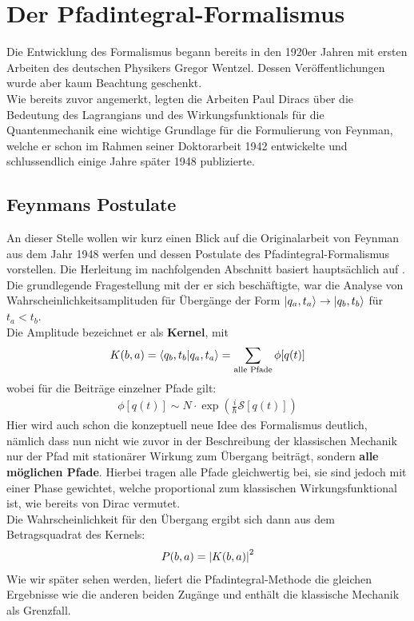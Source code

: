 \section{Der Pfadintegral-Formalismus}
Die Entwicklung des Formalismus begann bereits in den 1920er Jahren mit ersten Arbeiten des deutschen Physikers Gregor Wentzel. Dessen Veröffentlichungen wurde aber kaum Beachtung geschenkt. \\
Wie bereits zuvor angemerkt, legten die Arbeiten Paul Diracs über die Bedeutung des Lagrangians und des Wirkungsfunktionals für die Quantenmechanik eine wichtige Grundlage für die Formulierung von Feynman, welche er schon im Rahmen seiner Doktorarbeit 1942 entwickelte und schlussendlich einige Jahre später 1948 publizierte. 

\subsection{Feynmans Postulate}
An dieser Stelle wollen wir kurz einen Blick auf die Originalarbeit \cite{Feynman1948} von Feynman aus dem Jahr 1948 werfen und dessen Postulate des Pfadintegral-Formalismus vorstellen. Die Herleitung im nachfolgenden Abschnitt basiert hauptsächlich auf \cite{WeigandQFT2014}. \\
Die grundlegende Fragestellung mit der er sich beschäftigte, war die Analyse von Wahrscheinlichkeitsamplituden für Übergänge der Form $\ket{q_a,t_a}\rightarrow\ket{q_b,t_b}$ für $t_a<t_b$. \\
Die Amplitude bezeichnet er als \textbf{Kernel}, mit
\begin{align}
		K(b,a) = \braket{q_b,t_b}{q_a,t_a} 
			   = \sum_{\text{alle Pfade}}\phi[q(t)]
\end{align}
wobei für die Beiträge einzelner Pfade gilt:
\begin{align}
		\phi[q(t)] \sim N \cdot \exp\left(\frac{i}{\hbar}\mathcal{S}[q(t)]\right) 
\end{align} 	
Hier wird auch schon die konzeptuell neue Idee des Formalismus deutlich, nämlich dass nun nicht wie zuvor in der Beschreibung der klassischen Mechanik nur der Pfad mit stationärer Wirkung zum Übergang beiträgt, sondern \textbf{alle möglichen Pfade}. Hierbei tragen alle Pfade gleichwertig bei, sie sind jedoch  mit einer Phase gewichtet, welche proportional zum klassischen Wirkungsfunktional ist, wie bereits von Dirac vermutet. \\
Die Wahrscheinlichkeit für den Übergang ergibt sich dann aus dem Betragsquadrat des Kernels:
\begin{align}
	 P(b,a) = \abs{K(b,a)}^2 
\end{align}
Wie wir später sehen werden, liefert die Pfadintegral-Methode die gleichen Ergebnisse wie die anderen beiden Zugänge und enthält die klassische Mechanik als Grenzfall.
